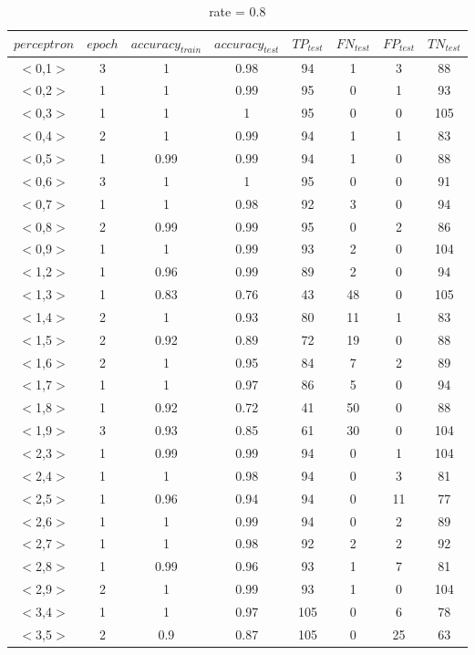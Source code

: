 \documentclass[11pt,letterpaper,oneside]{article}
\begin{document}
\begin{table}[th]
\caption{rate = 0.8}
\centering
\begin{tabular*}{\textwidth}{@{\extracolsep{\fill}}cccccccc}
\hline
$perceptron$ & $epoch$ & $accuracy_{train}$ & $accuracy_{test}$ & $TP_{test}$ & $FN_{test}$ & $FP_{test}$ & $TN_{test}$\\ \hline
$<$0,1$>$ & 3 & 1 & 0.98 & 94 & 1 & 3 & 88\\
$<$0,2$>$ & 1 & 1 & 0.99 & 95 & 0 & 1 & 93\\
$<$0,3$>$ & 1 & 1 & 1 & 95 & 0 & 0 & 105\\
$<$0,4$>$ & 2 & 1 & 0.99 & 94 & 1 & 1 & 83\\
$<$0,5$>$ & 1 & 0.99 & 0.99 & 94 & 1 & 0 & 88\\
$<$0,6$>$ & 3 & 1 & 1 & 95 & 0 & 0 & 91\\
$<$0,7$>$ & 1 & 1 & 0.98 & 92 & 3 & 0 & 94\\
$<$0,8$>$ & 2 & 0.99 & 0.99 & 95 & 0 & 2 & 86\\
$<$0,9$>$ & 1 & 1 & 0.99 & 93 & 2 & 0 & 104\\
$<$1,2$>$ & 1 & 0.96 & 0.99 & 89 & 2 & 0 & 94\\
$<$1,3$>$ & 1 & 0.83 & 0.76 & 43 & 48 & 0 & 105\\
$<$1,4$>$ & 2 & 1 & 0.93 & 80 & 11 & 1 & 83\\
$<$1,5$>$ & 2 & 0.92 & 0.89 & 72 & 19 & 0 & 88\\
$<$1,6$>$ & 2 & 1 & 0.95 & 84 & 7 & 2 & 89\\
$<$1,7$>$ & 1 & 1 & 0.97 & 86 & 5 & 0 & 94\\
$<$1,8$>$ & 1 & 0.92 & 0.72 & 41 & 50 & 0 & 88\\
$<$1,9$>$ & 3 & 0.93 & 0.85 & 61 & 30 & 0 & 104\\
$<$2,3$>$ & 1 & 0.99 & 0.99 & 94 & 0 & 1 & 104\\
$<$2,4$>$ & 1 & 1 & 0.98 & 94 & 0 & 3 & 81\\
$<$2,5$>$ & 1 & 0.96 & 0.94 & 94 & 0 & 11 & 77\\
$<$2,6$>$ & 1 & 1 & 0.99 & 94 & 0 & 2 & 89\\
$<$2,7$>$ & 1 & 1 & 0.98 & 92 & 2 & 2 & 92\\
$<$2,8$>$ & 1 & 0.99 & 0.96 & 93 & 1 & 7 & 81\\
$<$2,9$>$ & 2 & 1 & 0.99 & 93 & 1 & 0 & 104\\
$<$3,4$>$ & 1 & 1 & 0.97 & 105 & 0 & 6 & 78\\
$<$3,5$>$ & 2 & 0.9 & 0.87 & 105 & 0 & 25 & 63\\

\end{tabular*}
\end{table}
\end{document}
